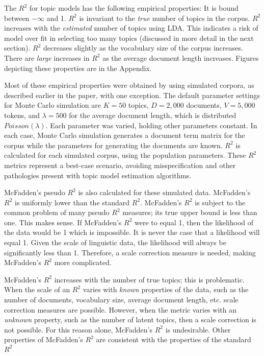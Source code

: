 \documentclass[conference,final,]{IEEEtran}
\begin{document}
The \(R^2\) for topic models has the following empirical properties: It
is bound between \(-\infty\) and 1. \(R^2\) is invariant to the
\textit{true} number of topics in the corpus. \(R^2\) increases with the
\textit{estimated} number of topics using LDA. This indicates a risk of
model over fit in selecting too many topics (discussed in more detail in
the next section). \(R^2\) decreases slightly as the vocabulary size of
the corpus increases. There are \textit{large} increases in \(R^2\) as
the average document length increases. Figures depicting these
properties are in the Appendix.

Most of these empirical properties were obtained by using simulated
corpora, as described earlier in the paper, with one exception. The
default parameter settings for Monte Carlo simulation are \(K = 50\)
topics, \(D = 2,000\) documents, \(V = 5,000\) tokens, and
\(\lambda = 500\) for the average document length, which is distributed
\(Poisson(\lambda)\). Each parameter was varied, holding other
parameters constant. In each case, Monte Carlo simulation generates a
document term matrix for the corpus while the parameters for generating
the documents are known. \(R^2\) is calculated for each simulated
corpus, using the population parameters. These \(R^2\) metrics represent
a best-case scenario, avoiding misspecification and other pathologies
present with topic model estimation algorithms.

McFadden's pseudo \(R^2\) is also calculated for these simulated data.
McFadden's \(R^2\) is uniformly lower than the standard \(R^2\).
McFadden's \(R^2\) is subject to the common problem of many pseudo
\(R^2\) measures; its true upper bound is less than one. This makes
sense. If McFadden's \(R^2\) were to equal 1, then the likelihood of the
data would be 1 which is impossible. It is never the case that a
likelihood will equal 1. Given the scale of linguistic data, the
likelihood will always be significantly less than 1. Therefore, a scale
correction measure is needed, making McFadden's \(R^2\) more
complicated.

McFadden's \(R^2\) increases with the number of true topics; this is
problematic. When the scale of an \(R^2\) varies with \textit{known}
properties of the data, such as the number of documents, vocabulary
size, average document length, etc. scale correction measures are
possible. However, when the metric varies with an \textit{unknown}
property, such as the number of latent topics, then a scale correction
is not possible. For this reason alone, McFadden's \(R^2\) is
undesirable. Other properties of McFadden's \(R^2\) are consistent with
the properties of the standard \(R^2\)
\end{document}
